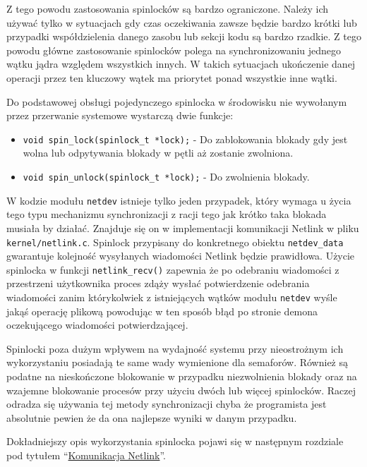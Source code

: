 \documentclass[10pt]{article}
\begin{document}
Z tego powodu zastosowania spinlocków są bardzo ograniczone. Należy ich
używać tylko w sytuacjach gdy czas oczekiwania zawsze będzie bardzo
krótki lub przypadki współdzielenia danego zasobu lub sekcji kodu są
bardzo rzadkie. Z tego powodu główne zastosowanie spinlocków polega na
synchronizowaniu jednego wątku jądra względem wszystkich innych. W
takich sytuacjach ukończenie danej operacji przez ten kluczowy wątek ma
priorytet ponad wszystkie inne wątki.

Do podstawowej obsługi pojedynczego spinlocka w środowisku nie wywołanym
przez przerwanie systemowe wystarczą dwie funkcje:

\begin{itemize}
\itemsep1pt\parskip0pt
\item
  \texttt{void spin\_lock(spinlock\_t *lock);} - Do zablokowania blokady
  gdy jest wolna lub odpytywania blokady w pętli aż zostanie zwolniona.
\item
  \texttt{void spin\_unlock(spinlock\_t *lock);} - Do zwolnienia
  blokady.
\end{itemize}

W kodzie modułu \texttt{netdev} istnieje tylko jeden przypadek, który
wymaga u życia tego typu mechanizmu synchronizacji z racji tego jak
krótko taka blokada musiała by działać. Znajduje się on w implementacji
komunikacji Netlink w pliku \texttt{kernel/netlink.c}. Spinlock
przypisany do konkretnego obiektu \texttt{netdev\_data} gwarantuje
kolejność wysyłanych wiadomości Netlink będzie prawidłowa. Użycie
spinlocka w funkcji \texttt{netlink\_recv()} zapewnia że po odebraniu
wiadomości z przestrzeni użytkownika proces zdąży wysłać potwierdzenie
odebrania wiadomości zanim którykolwiek z istniejących wątków modułu
\texttt{netdev} wyśle jakąś operację plikową powodując w ten sposób błąd
po stronie demona oczekującego wiadomości potwierdzającej.

Spinlocki poza dużym wpływem na wydajność systemu przy nieostrożnym ich
wykorzystaniu posiadają te same wady wymienione dla semaforów. Również
są podatne na nieskończone blokowanie w przypadku niezwolnienia blokady
oraz na wzajemne blokowanie procesów przy użyciu dwóch lub więcej
spinlocków. Raczej odradza się używania tej metody synchronizacji chyba
że programista jest absolutnie pewien że da ona najlepsze wyniki w danym
przypadku.

Dokładniejszy opis wykorzystania spinlocka pojawi się w następnym
rozdziale pod tytułem ``\hyperref[komunikacja-netlink]{Komunikacja
Netlink}''.
\end{document}
